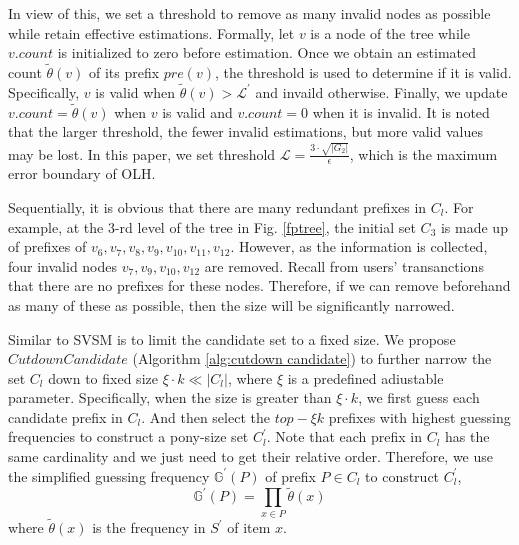 \documentclass[conference]{IEEEtran}
\begin{document}
In view of this, {\color{red}we set a threshold to remove as many invalid nodes as possible while retain effective estimations. Formally, let $v$ is a node of the tree while $v.count$ is initialized to zero before estimation. Once we obtain an estimated count $\tilde{\theta}(v)$ of its prefix $pre(v)$, the threshold is used to determine if it is valid. Specifically, $v$ is valid when $\tilde{\theta}(v) > \mathcal{L}^{\prime}$ and invaild otherwise. Finally, we update $v.count=\tilde{\theta}(v)$ when $v$ is valid and $v.count=0$ when it is invalid. It is noted that the larger threshold, the fewer invalid estimations, but more valid values may be lost. In this paper, we set threshold $\mathcal{L} = \frac{3\cdot \sqrt{|G_2|}}{\epsilon}$, which is the maximum error boundary of OLH.}

Sequentially, it is obvious that there are many redundant prefixes in $C_l$. For example, at the 3-rd level of the tree in Fig. \ref{fptree}, the initial set $C_3$ is made up of prefixes of $v_6,v_7,v_8,v_9,v_{10},v_{11},v_{12}$. However, as the information is collected, four invalid nodes $v_7,v_9,v_{10},v_{12}$ are removed. Recall from users' transanctions that there are no prefixes for these nodes. Therefore, if we can remove beforehand as many of these as possible, then the size will be significantly narrowed.

Similar to SVSM\cite{a2} is to limit the candidate set to a fixed size. We propose $CutdownCandidate$ (Algorithm \ref{alg:cutdown candidate}) to further narrow the set $C_l$ down to fixed size $\xi \cdot k \ll |C_l|$, where $\xi$ is a predefined adiustable parameter. Specifically, when the size is greater than $\xi \cdot k$, we first guess each candidate prefix in $C_l$. And then select the $top-\xi k$ prefixes with highest guessing frequencies to construct a pony-size set $C^{\prime}_{l}$. Note that each prefix in $C_l$ has the same cardinality and we just need to get their relative order. Therefore, we use the simplified guessing frequency $\mathbb{G}^{\prime}(P)$ of prefix $P \in C_l$ to construct $C^{\prime}_{l}$,
\begin{equation}
\mathbb{G}^{\prime}(P)=\prod_{x \in P} \tilde{\theta}(x) \label{simply gf}
\end{equation}
where $\tilde{\theta}(x)$ is the frequency in $S^{\prime}$ of item $x$.

\end{document}
